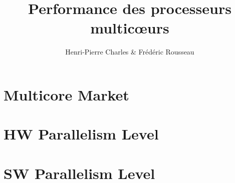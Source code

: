 \documentclass[aspectratio=169]{beamer}
\title{Performance des processeurs multic{\oe}urs}
\subtitle{}
\author{Henri-Pierre Charles \& Frédéric Rousseau}
\date{}
\newcommand{\Slide}[1]{}
\begin{document}
\begin{frame}
\titlepage
\end{frame}
\section{Multicore Market}
\Slide{Market/MotivatingExample1}
\Slide{Market/MotivatingExample2}
\Slide{Market/MotivatingExample3}
\Slide{Market/MotivatingCode1}
\Slide{Market/MotivatingCode2}
\Slide{Market/MotivatingCode3}
\begin{frame}
  \begin{multicols}{2}
{\small    \tableofcontents[
]}
  \end{multicols}
\end{frame}
\section{HW Parallelism Level}
\Slide{HWParallelismLevel/MultipleLevel}
\Slide{HWParallelismLevel/ILP}
\Slide{HWParallelismLevel/VLIW}
\Slide{HWParallelismLevel/uArch}
\Slide{HWParallelismLevel/MultiCore}
\Slide{HWParallelismLevel/MultiCPU}
\Slide{HWParallelismLevel/Cluster}
\Slide{HWParallelismLevel/Cluster2}
\Slide{HWParallelismLevel/MPSoC}
\Slide{HWParallelismLevel/GPU}

\section{SW Parallelism Level}
\Slide{SWParallelismLevel/Compiler}
\Slide{SWParallelismLevel/Thread}
\Slide{SWParallelismLevel/MPI}
\Slide{SWParallelismLevel/OpenMP}
\Slide{SWParallelismLevel/OpenCL}
\Slide{SWParallelismLevel/CUDA}
\end{document}
